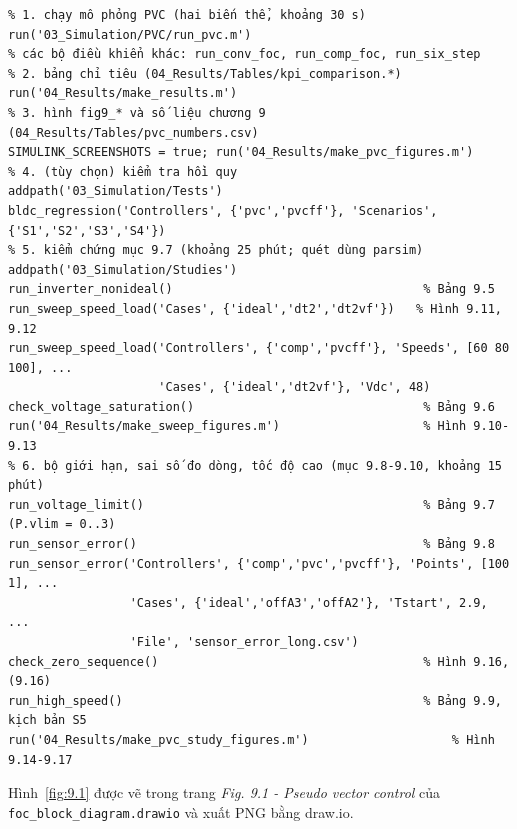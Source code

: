 \begin{Verbatim}
% 1. chạy mô phỏng PVC (hai biến thể, khoảng 30 s)
run('03_Simulation/PVC/run_pvc.m')
% các bộ điều khiển khác: run_conv_foc, run_comp_foc, run_six_step
% 2. bảng chỉ tiêu (04_Results/Tables/kpi_comparison.*)
run('04_Results/make_results.m')
% 3. hình fig9_* và số liệu chương 9 (04_Results/Tables/pvc_numbers.csv)
SIMULINK_SCREENSHOTS = true; run('04_Results/make_pvc_figures.m')
% 4. (tùy chọn) kiểm tra hồi quy
addpath('03_Simulation/Tests')
bldc_regression('Controllers', {'pvc','pvcff'}, 'Scenarios', {'S1','S2','S3','S4'})
% 5. kiểm chứng mục 9.7 (khoảng 25 phút; quét dùng parsim)
addpath('03_Simulation/Studies')
run_inverter_nonideal()                                   % Bảng 9.5
run_sweep_speed_load('Cases', {'ideal','dt2','dt2vf'})   % Hình 9.11, 9.12
run_sweep_speed_load('Controllers', {'comp','pvcff'}, 'Speeds', [60 80 100], ...
                     'Cases', {'ideal','dt2vf'}, 'Vdc', 48)
check_voltage_saturation()                                % Bảng 9.6
run('04_Results/make_sweep_figures.m')                    % Hình 9.10-9.13
% 6. bộ giới hạn, sai số đo dòng, tốc độ cao (mục 9.8-9.10, khoảng 15 phút)
run_voltage_limit()                                       % Bảng 9.7 (P.vlim = 0..3)
run_sensor_error()                                        % Bảng 9.8
run_sensor_error('Controllers', {'comp','pvc','pvcff'}, 'Points', [100 1], ...
                 'Cases', {'ideal','offA3','offA2'}, 'Tstart', 2.9, ...
                 'File', 'sensor_error_long.csv')
check_zero_sequence()                                     % Hình 9.16, (9.16)
run_high_speed()                                          % Bảng 9.9, kịch bản S5
run('04_Results/make_pvc_study_figures.m')                    % Hình 9.14-9.17
\end{Verbatim}

Hình~\ref{fig:9.1} được vẽ trong trang \emph{Fig. 9.1 - Pseudo vector control} của \texttt{foc\_block\_diagram.drawio} và xuất PNG bằng draw.io.
